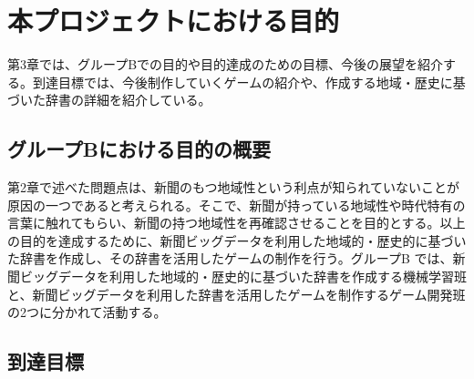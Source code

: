 \chapter{本プロジェクトにおける目的}
第3章では、グループBでの目的や目的達成のための目標、今後の展望を紹介する。到達目標では、今後制作していくゲームの紹介や、作成する地域・歴史に基づいた辞書の詳細を紹介している。
\section{グループBにおける目的の概要}
第2章で述べた問題点は、新聞のもつ地域性という利点が知られていないことが原因の一つであると考えられる。そこで、新聞が持っている地域性や時代特有の言葉に触れてもらい、新聞の持つ地域性を再確認させることを目的とする。以上の目的を達成するために、新聞ビッグデータを利用した地域的・歴史的に基づいた辞書を作成し、その辞書を活用したゲームの制作を行う。グループB では、新聞ビッグデータを利用した地域的・歴史的に基づいた辞書を作成する機械学習班と、新聞ビッグデータを利用した辞書を活用したゲームを制作するゲーム開発班の2つに分かれて活動する。

\section{到達目標}
